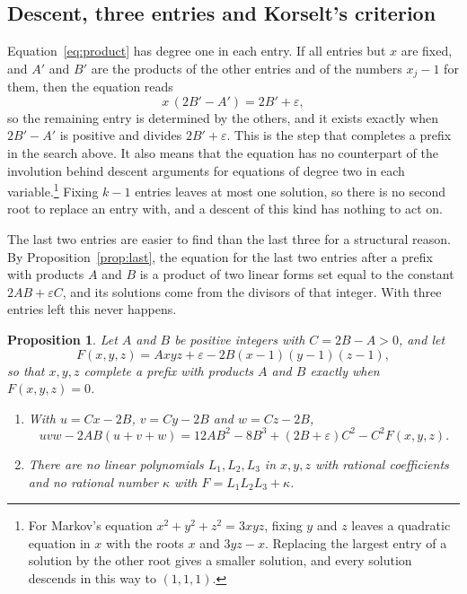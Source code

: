 \documentclass[11pt,reqno]{amsart}
\numberwithin{equation}{section}
\theoremstyle{plain}
\newtheorem{proposition}[theorem]{Proposition}
\theoremstyle{definition}
\theoremstyle{remark}
\begin{document}
\subsection{Descent, three entries and Korselt's criterion}\label{sec:structure}
Equation~\eqref{eq:product} has degree one in each entry. If all
entries but $x$ are fixed, and $A'$ and $B'$ are the products of the
other entries and of the numbers $x_j-1$ for them, then the equation
reads
\[
  x\,(2B'-A')=2B'+\varepsilon ,
\]
so the remaining entry is determined by the others, and it exists
exactly when $2B'-A'$ is positive and divides $2B'+\varepsilon$. This
is the step that completes a prefix in the search above. It also means
that the equation has no counterpart of the involution behind descent
arguments for equations of degree two in each variable.\footnote{For
Markov's equation $x^2+y^2+z^2=3xyz$, fixing $y$ and $z$ leaves a
quadratic equation in $x$ with the roots $x$ and $3yz-x$. Replacing the
largest entry of a solution by the other root gives a smaller
solution, and every solution descends in this way to $(1,1,1)$.}
Fixing $k-1$ entries leaves at most one solution, so there is no
second root to replace an entry with, and a descent of this kind has
nothing to act on.

The last two entries are easier to find than the last three for a
structural reason. By Proposition~\ref{prop:last}, the equation for the
last two entries after a prefix with products $A$ and $B$ is a product
of two linear forms set equal to the constant $2AB+\varepsilon C$, and
its solutions come from the divisors of that integer. With three
entries left this never happens.

\begin{proposition}\label{prop:threeentries}
Let $A$ and $B$ be positive integers with $C=2B-A>0$, and let
\[
  F(x,y,z)=Axyz+\varepsilon-2B(x-1)(y-1)(z-1),
\]
so that $x,y,z$ complete a prefix with products $A$ and $B$ exactly
when $F(x,y,z)=0$.
\begin{enumerate}[label=\textup{(\roman*)}]
\item With $u=Cx-2B$, $v=Cy-2B$ and $w=Cz-2B$,
\[
  uvw-2AB(u+v+w)=12AB^2-8B^3+(2B+\varepsilon)C^2-C^2F(x,y,z).
\]
\item There are no linear polynomials $L_1,L_2,L_3$ in $x,y,z$ with
rational coefficients and no rational number $\kappa$ with
$F=L_1L_2L_3+\kappa$.
\end{enumerate}
\end{proposition}
\end{document}
